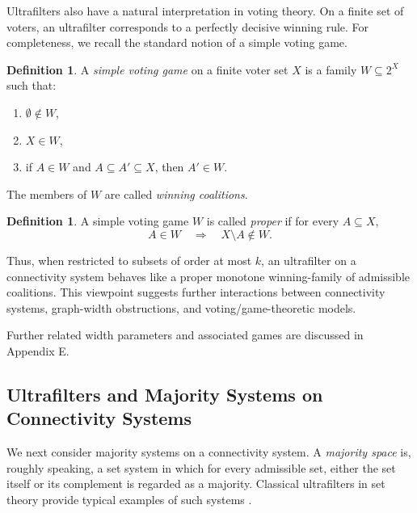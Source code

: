 \documentclass[10pt]{book}
\theoremstyle{definition}
\newtheorem{definition}[theorem]{Definition}
\begin{document}
Ultrafilters also have a natural interpretation in voting theory.  
On a finite set of voters, an ultrafilter corresponds to a perfectly decisive winning rule.  
For completeness, we recall the standard notion of a simple voting game.

\begin{definition}\cite{Axenovich2010OnTS}
A \emph{simple voting game} on a finite voter set \(X\) is a family \(W\subseteq 2^X\) such that:
\begin{enumerate}
    \item \(\emptyset \notin W\),
    \item \(X\in W\),
    \item if \(A\in W\) and \(A\subseteq A'\subseteq X\), then \(A'\in W\).
\end{enumerate}
The members of \(W\) are called \emph{winning coalitions}.
\end{definition}

\begin{definition}
A simple voting game \(W\) is called \emph{proper} if for every \(A\subseteq X\),
\[
A\in W \quad \Longrightarrow \quad X\setminus A \notin W.
\]
\end{definition}

Thus, when restricted to subsets of order at most \(k\), an ultrafilter on a connectivity system behaves like a proper monotone winning-family of admissible coalitions.  
This viewpoint suggests further interactions between connectivity systems, graph-width obstructions, and voting/game-theoretic models.

Further related width parameters and associated games are discussed in Appendix E.

\subsection{Ultrafilters and Majority Systems on Connectivity Systems}

We next consider majority systems on a connectivity system.
A \emph{majority space} is, roughly speaking, a set system in which for every admissible set,
either the set itself or its complement is regarded as a majority.
Classical ultrafilters in set theory provide typical examples of such systems
\cite{salame2006majority,pacuit2006majority,pacuit2004majority}.
\end{document}
